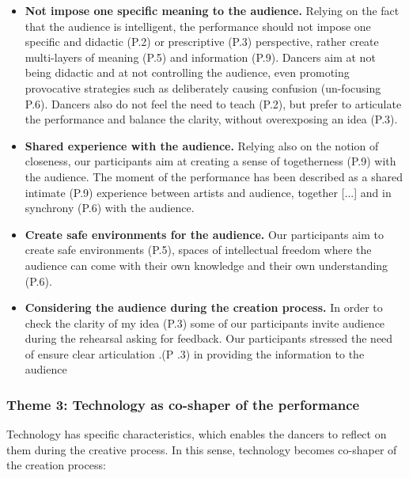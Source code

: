 \begin{itemize}
\item \textbf{Not impose one specific meaning to the audience.} Relying on the fact that the audience is intelligent, the performance should not impose one specific and didactic (P.2) or prescriptive (P.3) perspective, rather create multi-layers of meaning (P.5) and information (P.9). Dancers aim at not being didactic and at not controlling the audience, even promoting provocative strategies such as deliberately causing confusion (un-focusing P.6). Dancers also do not feel the need to teach (P.2), but prefer to articulate the performance and balance the clarity, without overexposing an idea (P.3).
\item \textbf{Shared experience with the audience.} Relying also on the notion of closeness, our participants aim at creating a sense of togetherness (P.9) with the audience. The moment of the performance has been described as a shared intimate (P.9) experience between artists and audience, together [...] and in synchrony (P.6) with the audience.
\item \textbf{Create safe environments for the audience.} Our participants aim to create safe environments (P.5), spaces of intellectual freedom where the audience can come with their own knowledge and their own understanding (P.6).
\item \textbf{Considering the audience during the creation process.} In order to check the clarity of my idea (P.3) some of our participants invite audience during the rehearsal asking for feedback. Our participants stressed the need of ensure clear articulation .(P .3) in providing the information to the audience
\end{itemize}


\subsubsection{Theme 3: Technology as co-shaper of the performance}

Technology has specific characteristics, which enables the dancers to reflect on them during the creative process. In this sense, technology becomes co-shaper of the creation process:


